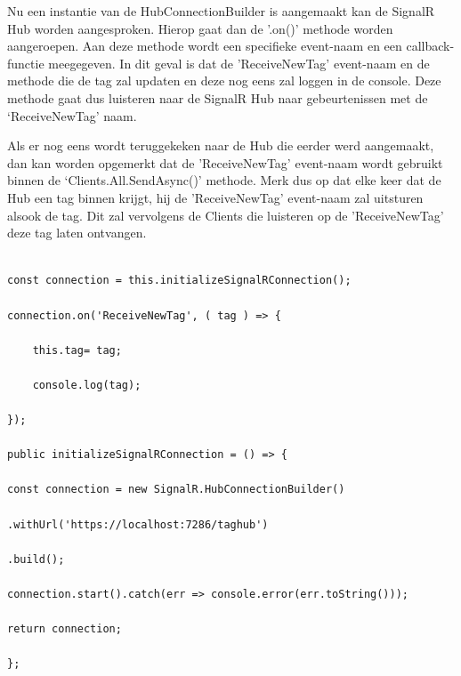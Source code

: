 Nu een instantie van de HubConnectionBuilder is aangemaakt kan de SignalR Hub worden aangesproken. Hierop gaat dan de '.on()' methode worden aangeroepen. Aan deze methode wordt een specifieke event-naam en een callback-functie meegegeven. In dit geval is dat de 'ReceiveNewTag’ event-naam en de methode die de tag zal updaten en deze nog eens zal loggen in de console. Deze methode gaat dus luisteren naar de SignalR Hub naar gebeurtenissen met de ‘ReceiveNewTag' naam. 

Als er nog eens wordt teruggekeken naar de Hub die eerder werd aangemaakt, dan kan worden opgemerkt dat de 'ReceiveNewTag’ event-naam wordt gebruikt binnen de ‘Clients.All.SendAsync()’ methode. Merk dus op dat elke keer dat de Hub een tag binnen krijgt, hij de 'ReceiveNewTag’ event-naam zal uitsturen alsook de tag. Dit zal vervolgens de Clients die luisteren op de 'ReceiveNewTag’ deze tag laten ontvangen. 

\begin{verbatim} 
    
const connection = this.initializeSignalRConnection(); 

connection.on('ReceiveNewTag', ( tag ) => { 
    
    this.tag= tag; 
    
    console.log(tag); 
    
}); 

public initializeSignalRConnection = () => { 

const connection = new SignalR.HubConnectionBuilder() 

.withUrl('https://localhost:7286/taghub') 

.build(); 

connection.start().catch(err => console.error(err.toString())); 

return connection; 

}; 
    
\end{verbatim} 




